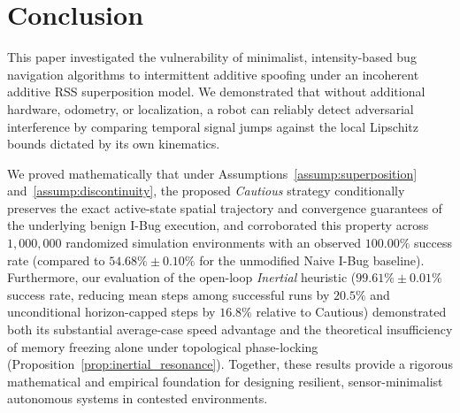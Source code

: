 \documentclass[12pt, a4paper]{article}
\begin{document}
\section{Conclusion}
\label{sec:conclusion}
This paper investigated the vulnerability of minimalist, intensity-based bug navigation algorithms to intermittent additive spoofing under an incoherent additive RSS superposition model. We demonstrated that without additional hardware, odometry, or localization, a robot can reliably detect adversarial interference by comparing temporal signal jumps against the local Lipschitz bounds dictated by its own kinematics.

We proved mathematically that under Assumptions~\ref{assump:superposition} and~\ref{assump:discontinuity}, the proposed \textit{Cautious} strategy conditionally preserves the exact active-state spatial trajectory and convergence guarantees of the underlying benign I-Bug execution, and corroborated this property across $1,000,000$ randomized simulation environments with an observed $100.00\%$ success rate (compared to $54.68\% \pm 0.10\%$ for the unmodified Naive I-Bug baseline). Furthermore, our evaluation of the open-loop \textit{Inertial} heuristic ($99.61\% \pm 0.01\%$ success rate, reducing mean steps among successful runs by $20.5\%$ and unconditional horizon-capped steps by $16.8\%$ relative to Cautious) demonstrated both its substantial average-case speed advantage and the theoretical insufficiency of memory freezing alone under topological phase-locking (Proposition~\ref{prop:inertial_resonance}). Together, these results provide a rigorous mathematical and empirical foundation for designing resilient, sensor-minimalist autonomous systems in contested environments.
\end{document}
